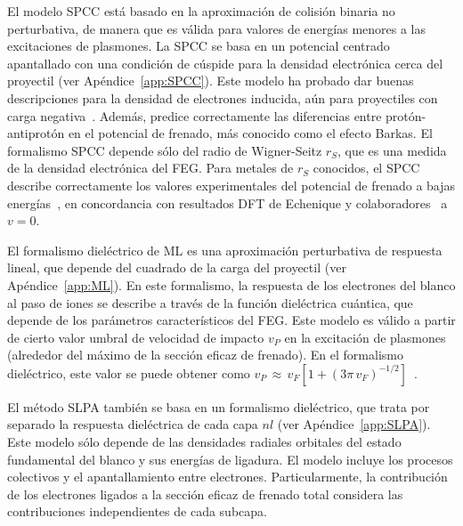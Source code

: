El modelo SPCC está basado en la aproximación de colisión binaria no 
perturbativa, de manera que es válida para valores de energías menores a 
las excitaciones de plasmones. La SPCC se basa en un potencial centrado 
apantallado con una condición de cúspide para la densidad electrónica 
cerca del proyectil (ver Apéndice~\ref{app:SPCC}). Este modelo ha 
probado dar buenas descripciones para la densidad de electrones inducida, 
aún para proyectiles con carga negativa~\cite{Montanari:17}. 
Además, predice correctamente las diferencias entre protón-antiprotón en 
el potencial de frenado, más conocido como el efecto Barkas. El 
formalismo SPCC depende sólo del radio de Wigner-Seitz $r_S$, que es una 
medida de la densidad electrónica del FEG. Para metales de $r_S$ 
conocidos, el SPCC describe correctamente los valores experimentales del 
potencial de frenado a bajas energías~\cite{Montanari:17}, en 
concordancia con resultados DFT de Echenique y 
colaboradores~\cite{Echenique:81,Nagy:89} a $v=0$.

El formalismo dieléctrico de ML es una aproximación perturbativa de 
respuesta lineal, que depende del cuadrado de la carga del proyectil 
(ver Apéndice~\ref{app:ML}). En este formalismo, la respuesta de los 
electrones del blanco al paso de iones se describe a través de la 
función dieléctrica cuántica, que depende de los parámetros 
característicos del FEG. Este modelo es válido a partir de cierto valor 
umbral de velocidad de impacto $v_P$ en la excitación de plasmones 
(alrededor del máximo de la sección eficaz de frenado). En el formalismo 
dieléctrico, este valor se puede obtener como 
$v_P\,\approx\,v_F[1+(3\pi\,v_F)^{-1/2}]$~\cite{suppression}. 

El método SLPA también se basa en un formalismo dieléctrico, que trata 
por separado la respuesta dieléctrica de cada capa $nl$ (ver 
Apéndice~\ref{app:SLPA}). Este modelo sólo depende de las densidades 
radiales orbitales del estado fundamental del blanco y sus energías de 
ligadura. El modelo incluye los procesos colectivos y el apantallamiento 
entre electrones. Particularmente, la contribución de los electrones 
ligados a la sección eficaz de frenado total considera las 
contribuciones independientes de cada subcapa. 

